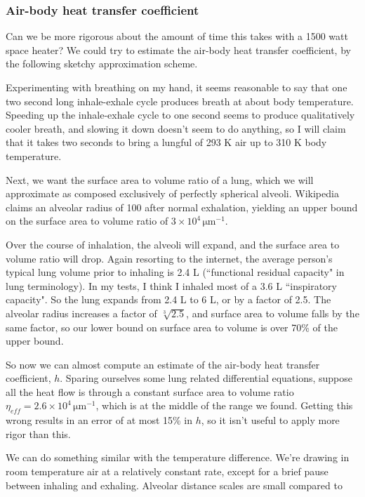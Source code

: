 \documentclass[12pt]{article}
\begin{document}
\subsubsection{Air-body heat transfer coefficient}

Can we be more rigorous about the amount of time this takes with a 1500 watt space heater? We could try to estimate the air-body heat transfer coefficient, by the following sketchy approximation scheme.

Experimenting with breathing on my hand, it seems reasonable to say that one two second long inhale-exhale cycle produces breath at about body temperature. Speeding up the inhale-exhale cycle to one second seems to produce qualitatively cooler breath, and slowing it down doesn't seem to do anything, so I will claim that  it takes two seconds to bring a lungful of 293 K air up to 310 K body temperature.

Next, we want the surface area to volume ratio of a lung, which we will approximate as composed exclusively of perfectly spherical alveoli. Wikipedia claims an alveolar radius of 100 \micron after normal exhalation, yielding an upper bound on the surface area to volume ratio of \(3\times10^4 \,\mathrm{\mu m}^{-1}\).

Over the course of inhalation, the alveoli will expand, and the surface area to volume ratio will drop. Again resorting to the internet, the average person's typical lung volume prior to inhaling is 2.4 L (``functional residual capacity" in lung terminology). In my tests, I think I inhaled most of a 3.6 L ``inspiratory capacity". So the lung expands from 2.4 L to 6 L, or by a factor of 2.5. The alveolar radius increases a factor of \(\sqrt[3]{2.5}\), and surface area to volume falls by the same factor, so our lower bound on surface area to volume is over 70\% of the upper bound.

So now we can almost compute an estimate of the air-body heat transfer coefficient, \(h\). Sparing ourselves some lung related differential equations, suppose all the heat flow is through a constant surface area to volume ratio \(\eta_{eff} = 2.6 \times 10^4 \,\mathrm{\mu m}^{-1}\), which is at the middle of the range we found. Getting this wrong results in an error of at most 15\% in \(h\), so it isn't useful to apply more rigor than this.

We can do something similar with the temperature difference.  We're drawing in room temperature air at a relatively constant rate, except for a brief pause between inhaling and exhaling. Alveolar distance scales are small compared to 
\end{document}
